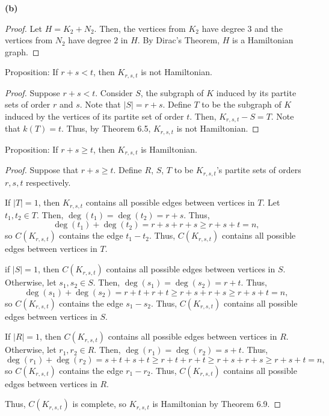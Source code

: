 \documentclass[12pt]{article}
\begin{document}
    {\bf (b)}
    \begin{proof}
	Let $H = K_2 + N_2$.
	Then, the vertices from $K_2$ have degree $3$ and the vertices from $N_2$ have degree $2$ in $H$.
	By Dirac's Theorem, $H$ is a Hamiltonian graph.
    \end{proof}


\newpage{} Proposition: If $r+s<t$, then $K_{r,s,t}$ is not Hamiltonian.
\begin{proof}
	Suppose $r + s < t$.
	Consider $S$, the subgraph of $K$ induced by its partite sets of order $r$ and $s$.
	Note that $|S| = r + s$.
	Define $T$ to be the subgraph of $K$ induced by the vertices of its partite set of order $t$.
	Then, $K_{r,s,t} - S = T$.
	Note that $k(T) = t$.
	Thus, by Theorem 6.5, $K_{r,s,t}$ is not Hamiltonian.
\end{proof}

\newpage{} Proposition: If $r+s \geq t$, then $K_{r,s,t}$ is Hamiltonian.
\begin{proof}
	Suppose that $r+s \geq t$.
	Define $R$, $S$, $T$ to be $K_{r,s,t}$'s partite sets of orders $r,s,t$ respectively.
	
	If $|T| = 1$, then $K_{r,s,t}$ contains all possible edges between vertices in $T$.
	Let $t_1,t_2 \in T$.
	Then, $\deg(t_1) = \deg(t_2) = r + s$.
	Thus, $$\deg(t_1) + \deg(t_2) = r + s + r + s \geq r + s + t = n,$$ so $C(K_{r,s,t})$ contains the edge $t_1-t_2$.
	Thus, $C(K_{r,s,t})$ contains all possible edges between vertices in $T$.

	if $|S| = 1$, then $C(K_{r,s,t})$ contains all possible edges between vertices in $S$.
	Otherwise, let $s_1, s_2 \in S$. 
	Then, $\deg(s_1) = \deg(s_2) = r + t$.
	Thus, $$\deg(s_1) + \deg(s_2) = r + t + r + t \geq r + s + r + s \geq r + s + t = n,$$ so $C(K_{r,s,t})$ contains the edge $s_1-s_2$.
	Thus, $C(K_{r,s,t})$ contains all possible edges between vertices in $S$.

	If $|R| = 1$, then $C(K_{r,s,t})$ contains all possible edges between vertices in $R$.
	Otherwise, let $r_1, r_2 \in R$.
	Then, $\deg(r_1) = \deg(r_2) = s + t$.
	Thus, $$\deg(r_1) + \deg(r_2) = s + t + s + t \geq r + t + r + t \geq r + s + r + s \geq r + s + t = n,$$ so $C(K_{r,s,t})$ contains the edge $r_1-r_2$.
	Thus, $C(K_{r,s,t})$ contains all possible edges between vertices in $R$.

	Thus, $C(K_{r,s,t})$ is complete, so $K_{r,s,t}$ is Hamiltonian by Theorem 6.9.

\end{proof}
\end{document}
